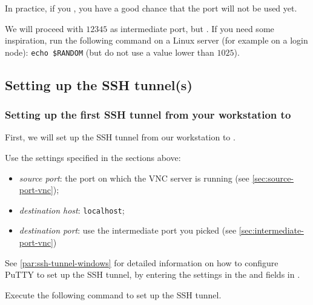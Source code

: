 In practice, if you , you have a good chance that the
port will not be used yet.

We will proceed with $12345$ as intermediate port, but . If you need some inspiration, run the following command on a Linux server
(for example on a login node): \texttt{echo \$RANDOM} (but do not use a value lower than $1025$).

\subsection{Setting up the SSH tunnel(s)}
\label{sec:ssh-tunnel-vnc}

\subsubsection{Setting up the first SSH tunnel from your workstation to \loginnode}

First, we will set up the SSH tunnel from our workstation to \loginnode.

Use the settings specified in the sections above:

\begin{itemize}
\item \emph{source port}: the port on which the VNC server is running (see \autoref{sec:source-port-vnc});
\item \emph{destination host}: \lstinline|localhost|;
\item \emph{destination port}: use the intermediate port you picked (see \autoref{sec:intermediate-port-vnc})
\end{itemize}

\ifwindows

See \autoref{par:ssh-tunnel-windows} for detailed information on how to configure PuTTY to set up the SSH tunnel,
by entering the settings in the  and  fields in .

\else

Execute the following command to set up the SSH tunnel.\\

\begin{prompt}
\end{prompt}


